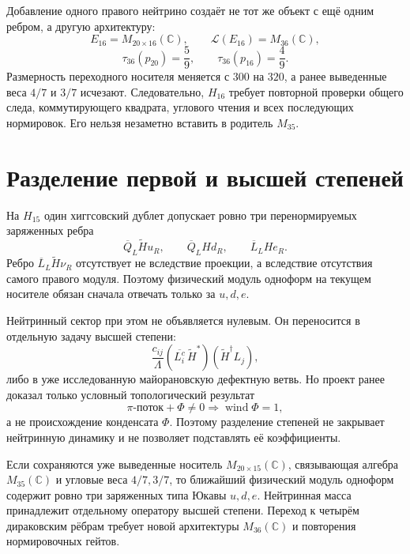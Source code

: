 Добавление одного правого нейтрино создаёт не тот же объект с ещё одним
ребром, а другую архитектуру:
\begin{equation}
 E_{16}=M_{20\times16}(\mathbb C),\qquad
 \mathcal L(E_{16})=M_{36}(\mathbb C),
\end{equation}
\begin{equation}
 \tau_{36}(p_{20})=\frac59,
 \qquad
 \tau_{36}(p_{16})=\frac49.
\end{equation}
Размерность переходного носителя меняется с $300$ на $320$, а ранее
выведенные веса $4/7$ и $3/7$ исчезают. Следовательно, $H_{16}$ требует
повторной проверки общего следа, коммутирующего квадрата, углового чтения и
всех последующих нормировок. Его нельзя незаметно вставить в родитель
$M_{35}$.

\section{Разделение первой и высшей степеней}

На $H_{15}$ один хиггсовский дублет допускает ровно три
перенормируемых заряженных ребра
\begin{equation}
 \overline Q_L\widetilde H u_R,
 \qquad
 \overline Q_L H d_R,
 \qquad
 \overline L_L H e_R.
\end{equation}
Ребро $\overline L_L\widetilde H\nu_R$ отсутствует не вследствие
проекции, а вследствие отсутствия самого правого модуля. Поэтому
физический модуль одноформ на текущем носителе обязан сначала отвечать
только за $u,d,e$.

Нейтринный сектор при этом не объявляется нулевым. Он переносится в
отдельную задачу высшей степени:
\begin{equation}
 \frac{c_{ij}}{\Lambda}
 (\overline{L_i^c}\,\widetilde H^*)
 (\widetilde H^\dagger L_j),
\end{equation}
либо в уже исследованную майорановскую дефектную ветвь. Но проект ранее
доказал только условный топологический результат
\begin{equation}
 \pi\text{-поток}+\Phi\ne0
 \Longrightarrow \operatorname{wind}\Phi=1,
\end{equation}
а не происхождение конденсата $\Phi$. Поэтому разделение степеней не
закрывает нейтринную динамику и не позволяет подставлять её коэффициенты.

\begin{theorem}
Если сохраняются уже выведенные носитель $M_{20\times15}(\mathbb C)$,
связывающая алгебра $M_{35}(\mathbb C)$ и угловые веса $4/7,3/7$, то
ближайший физический модуль одноформ содержит ровно три заряженных типа
Юкавы $u,d,e$. Нейтринная масса принадлежит отдельному оператору высшей
степени. Переход к четырём дираковским рёбрам требует новой архитектуры
$M_{36}(\mathbb C)$ и повторения нормировочных гейтов.
\end{theorem}

